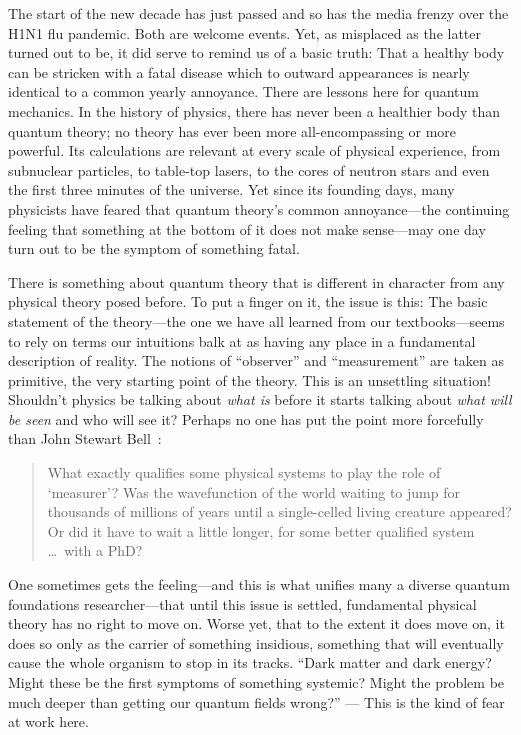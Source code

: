 The start of the new decade has just passed and so has the media frenzy over the H1N1 flu pandemic.  Both are welcome events.  Yet, as misplaced as the latter turned out to be, it did serve to remind us of a basic truth:  That a healthy body can be stricken with a fatal disease which to outward appearances is nearly identical to a common yearly annoyance.  There are lessons here for quantum mechanics.  In the history of physics, there has never been a healthier body than quantum theory; no theory has ever been more all-encompassing or more powerful.  Its calculations are relevant at every scale of physical experience, from subnuclear particles, to table-top lasers, to the cores of neutron stars and even the first three minutes of the universe.  Yet since its founding days, many physicists have feared that quantum theory's common annoyance---the continuing feeling that something at the bottom of it does not make sense---may one day turn out to be the symptom of something fatal.

There is something about quantum theory that is different in character from any physical theory posed before.  To put a finger on it, the issue is this:  The basic statement of the theory---the one we have all learned from our textbooks---seems to rely on terms our intuitions balk at as having any place in a fundamental description of reality.  The notions of ``observer'' and ``measurement'' are taken as primitive, the very starting point of the theory.  This is an unsettling situation!  Shouldn't physics be talking about {\it what is\/} before it starts talking about {\it what will be seen\/} and who will see it?  Perhaps no one has put the point more forcefully than John Stewart Bell~\cite{Bell90}:
\begin{quote}\small
What exactly qualifies some physical systems to play the role of `measurer'?  Was the wavefunction of the world waiting to jump for thousands of millions of years until a single-celled living creature appeared?  Or did it have to wait a little longer, for some better qualified system \ldots\ with a PhD?
\end{quote}
One sometimes gets the feeling---and this is what unifies many a diverse quantum foundations researcher---that until this issue is settled, fundamental physical theory has no right to move on.  Worse yet, that to the extent it does move on, it does so only as the carrier of something insidious, something that will eventually cause the whole organism to stop in its tracks.  ``Dark matter and dark energy?  Might these be the first symptoms of  something systemic?  Might the problem be much deeper than getting our quantum fields wrong?'' --- This is the kind of fear at work here.

